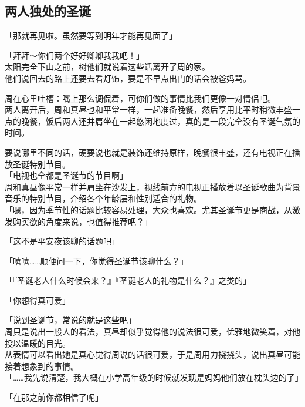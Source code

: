 \subsection{两人独处的圣诞}

「那就再见啦。虽然要等到明年才能再见面了」

「拜拜～你们两个好好卿卿我我吧！」\\

太阳完全下山之前，树他们就说着这些话离开了周的家。\\

他们说回去的路上还要去看灯饰，要是不早点出门的话会被爸妈骂。

周在心里吐槽：嘴上那么调侃着，可你们做的事情比我们更像一对情侣吧。\\

两人离开后，周和真昼也和平常一样，一起准备晚餐，然后享用比平时稍微丰盛一点的晚餐，饭后两人还并肩坐在一起悠闲地度过，真的是一段完全没有圣诞气氛的时间。

要说哪里不同的话，硬要说也就是装饰还维持原样，晚餐很丰盛，还有电视正在播放圣诞特别节目。\\

「电视也全都是圣诞节的节目啊」\\

周和真昼像平常一样并肩坐在沙发上，视线前方的电视正播放着以圣诞歌曲为背景音乐的特别节目，介绍各个年龄层和性别适合的礼物。\\

「嗯，因为季节性的话题比较容易处理，大众也喜欢。尤其圣诞节更是商战，从激发购买欲的角度来说，也值得推荐吧？」

「这不是平安夜该聊的话题吧」

「嘻嘻……顺便问一下，你觉得圣诞节该聊什么？」

「『圣诞老人什么时候会来？』『圣诞老人的礼物是什么？』之类的」

「你想得真可爱」

「说到圣诞节，常说的就是这些吧」\\

周只是说出一般人的看法，真昼却似乎觉得他的说法很可爱，优雅地微笑着，对他投以温暖的目光。\\

从表情可以看出她是真心觉得周说的话很可爱，于是周用力挠挠头，说出真昼可能接着想象到的事情。\\

「……我先说清楚，我大概在小学高年级的时候就发现是妈妈他们放在枕头边的了」

「在那之前你都相信了呢」

